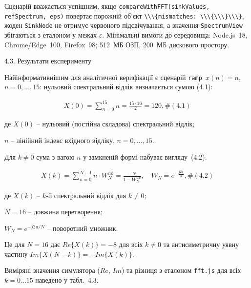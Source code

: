 \documentclass[
]{article}
\newcommand{\passthrough}[1]{#1}
\begin{document}
Сценарій вважається успішним, якщо
\passthrough{\lstinline!compareWithFFT!}\passthrough{\lstinline!(!}\passthrough{\lstinline!sinkValues!}\passthrough{\lstinline!, !}\passthrough{\lstinline!refSpectrum!}\passthrough{\lstinline!, eps)!}
повертає порожній об'єкт
\passthrough{\lstinline!\\\{mismatches: \\\{\\\}\\\}!}, жоден
\passthrough{\lstinline!SinkNode!} не отримує червоного підсвічування, а
значення \passthrough{\lstinline!SpectrumView!} збігаються з еталоном у
межах \(\varepsilon\). Мінімальні вимоги до середовища: Node.js~18,
Chrome/Edge~100, Firefox~98; 512~МБ ОЗП, 200~МБ дискового простору.

\protect{}\label{X2c95f06dc8830c6c22461aaa9f63c5b7a63654c}{}4.3.
Результати експерименту

Найінформативнішим для аналітичної верифікації є сценарій
\passthrough{\lstinline!ramp!}\passthrough{\lstinline! !}\(x(n) = n\),
\(n = 0,\ldots,15\): нульовий спектральний відлік визначається сумою
(4.1):

\[\begin{array}{r}
X(0) = \sum_{n = 0}^{15}n = \frac{15 \cdot 16}{2} = 120,\#(4.1)
\end{array}\]

де \(X(0)\) -- нульовий (постійна складова) спектральний відлік;

\(n\) -- лінійний індекс вхідного відліку, \(n = 0,\ldots,15\).

Для \(k \neq 0\) сума з вагою \(n\) у замкненій формі набуває
вигляду~(4.2):

\[\begin{array}{r}
X(k) = \sum_{n = 0}^{N - 1}n \cdot W_{N}^{nk} = \frac{- N}{1 - W_{N}^{- k}},\quad W_{N} = e^{- \frac{j2\pi}{N}},\#(4.2)
\end{array}\]

де \(X(k)\) -- \(k\)-й спектральний відлік для \(k \neq 0\);

\(N = 16\) -- довжина перетворення;

\(W_{N} = e^{- j2\pi/N}\) -- поворотний множник.

Це для \(N = 16\) дає \(Re\{ X(k)\} = - 8\) для всіх \(k \neq 0\) та
антисиметричну уявну частину \(Im\{ X(N - k)\} = - Im\{ X(k)\}\).

Виміряні значення симулятора (\(Re\), \(Im\)) та різниця з еталоном
\passthrough{\lstinline!fft.js!} для всіх \(k = 0\ldots 15\) наведено у
табл.~4.3.
\end{document}
